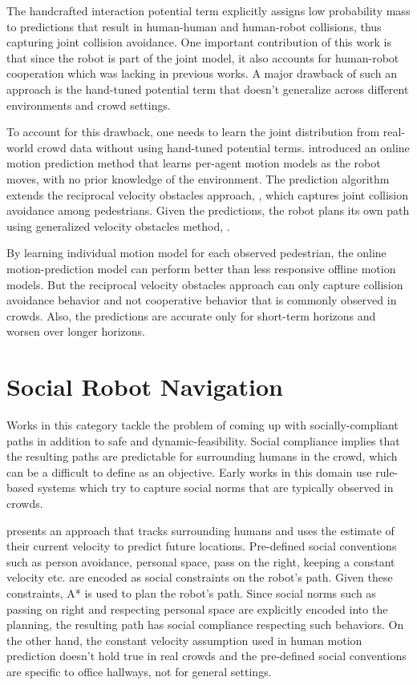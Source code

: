 The handcrafted interaction potential term explicitly assigns low probability mass to predictions that result in human-human and human-robot collisions, thus capturing joint collision avoidance. One important contribution of this work is that since the robot is part of the joint model, it also accounts for human-robot cooperation which was lacking in previous works. A major drawback of such an approach is the hand-tuned potential term that doesn't generalize across different environments and crowd settings.

To account for this drawback, one needs to learn the joint distribution from real-world crowd data without using hand-tuned potential terms. \cite{kim2014brvo} introduced an online motion prediction method that learns per-agent motion models as the robot moves, with no prior knowledge of the environment. The prediction algorithm extends the reciprocal velocity obstacles approach, \cite{van2008reciprocal}, which captures joint collision avoidance among pedestrians. Given the predictions, the robot plans its own path using generalized velocity obstacles method, \cite{wilkie2009generalized}.

By learning individual motion model for each observed pedestrian, the online motion-prediction model can perform better than less responsive offline motion models. But the reciprocal velocity obstacles approach can only capture collision avoidance behavior and not cooperative behavior that is commonly observed in crowds. Also, the predictions are accurate only for short-term horizons and worsen over longer horizons.


\section{Social Robot Navigation}
\label{sec:survey-soci-robot-navig-1}

Works in this category tackle the problem of coming up with socially-compliant paths in addition to safe and dynamic-feasibility. Social compliance implies that the resulting paths are predictable for surrounding humans in the crowd, which can be a difficult to define as an objective. Early works in this domain use rule-based systems which try to capture social norms that are typically observed in crowds.

\cite{kirby2009companion} presents an approach that tracks surrounding humans and uses the estimate of their current velocity to predict future locations. Pre-defined social conventions such as person avoidance, personal space, pass on the right, keeping a constant velocity etc. are encoded as social constraints on the robot's path. Given these constraints, A* is used to plan the robot's path. Since social norms such as passing on right and respecting personal space are explicitly encoded into the planning, the resulting path has social compliance respecting such behaviors. On the other hand, the constant velocity assumption used in human motion prediction doesn't hold true in real crowds and the pre-defined social conventions are specific to office hallways, not for general settings.


